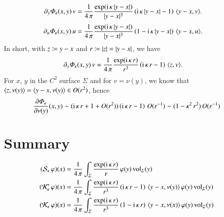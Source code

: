\documentclass[
	,12pt%
	,pagesize%
	,headings=small%
	,paper=a4%
	,parskip=false%
	,abstract=on
	,toc=bibliography
]{scrartcl}
\theoremstyle{definition}
\theoremstyle{remark}
\begin{document}
\begin{align*}
	\partial_y \varPhi_\kappa(x,y) \, v 
	&=
	\frac{1}{4 \, \pi} \frac{\exp({\operatorname{i}} \, \kappa \, \lvert{y-x}\rvert)}{\lvert{y-x}\rvert^3} \left({\operatorname{i}}\,\kappa\,\lvert{y-x}\rvert - 1\right)\,\langle{y-x,v}\rangle
	. 
\end{align*}
\begin{align*}
	\partial_u \varPhi_\kappa(x,y) \, u
	&=
	\frac{1}{4 \, \pi} \frac{\exp({\operatorname{i}} \, \kappa \, \lvert{y-x}\rvert)}{\lvert{y-x}\rvert^3} \left(1 - {\operatorname{i}}\,\kappa\,\lvert{y-x}\rvert\right)\,\langle{y-x,u}\rangle
	. 
\end{align*}
In short, with $z \coloneqq y-x$ and $r \coloneqq \lvert{z}\rvert = \lvert{y-x}\rvert$, we have
\begin{align*}
	\partial_y \varPhi_\kappa(x,y) \, v 
	&=
	\frac{1}{4 \, \pi} \frac{\exp({\operatorname{i}} \, \kappa \, r)}{r^3} \left( {\operatorname{i}} \, \kappa \, r - 1 \right)\, \langle{z,v}\rangle
	. 
\end{align*}
For $x$, $y$ in the $C^2$ surface $\varSigma$ and for $v = \nu(y)$, we know that $\langle{z,\nu(y)}\rangle = \langle{y-x,\nu(y)}\rangle \in O(r^2)$, hence
\begin{align*}
	\frac{\partial \varPhi_\kappa}{\partial \nu(y)} (x,y)
	\sim
	({\operatorname{i}} \, \kappa \, r + 1 +O(r^2)) \left( {\operatorname{i}} \, \kappa \, r - 1 \right)\, O(r^{-1})
	\sim
	(1 - \kappa^2 \, r^2) \, O(r^{-1})	
\end{align*}

\section{Summary}

\begin{align*}
	(\mathcal{S}_\kappa \, \varphi)(x)
	&=
	\frac{1}{4 \, \pi}  \int_{\varSigma}
		\frac{\exp({\operatorname{i}} \, \kappa \, r)}{r} \, \varphi(y)
	\, {\operatorname{vol}}_\varSigma(y)
	\\
	(\mathcal{K}_\kappa' \, \varphi)(x)
	&=
	\frac{1}{4 \, \pi}  \int_{\varSigma}
		\frac{\exp({\operatorname{i}} \, \kappa \, r)}{r^3} \left({\operatorname{i}} \, \kappa \, r - 1\right)\, \langle{y-x,\nu(y)}\rangle \, \varphi(y)
	\, {\operatorname{vol}}_\varSigma(y)
	\\
	(\mathcal{K}_\kappa \, \varphi)(x)
	&=
	\frac{1}{4 \, \pi}  \int_{\varSigma}
		\frac{\exp({\operatorname{i}} \, \kappa \, r)}{r^3} \left(1 - {\operatorname{i}} \, \kappa \, r\right)\, \langle{y-x,\nu(x)}\rangle \, \varphi(y)
	\, {\operatorname{vol}}_\varSigma(y)
\end{align*}
\end{document}
